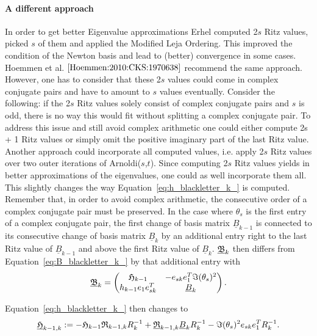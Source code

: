 \documentclass{scrartcl}
\numberwithin{equation}{section}
\begin{document}
\paragraph{A different approach}
In order to get better Eigenvalue approximations Erhel \cite{Erhel95aparallel} computed 2$s$ Ritz values, picked $s$ of them and applied the Modified Leja Ordering. This improved the condition of the Newton basis and lead to (better) convergence in some cases. Hoemmen et al. $\cite{Hoemmen:2010:CKS:1970638}$ recommend the same approach. However, one has to consider that these 2$s$ values could come in complex conjugate pairs and have to amount to $s$ values eventually. Consider the following: if the 2$s$ Ritz values solely consist of complex conjugate pairs and $s$ is odd, there is no way this would fit without splitting a complex conjugate pair. To address this issue and still avoid complex arithmetic one could either compute 2s + 1 Ritz values or simply omit the positive imaginary part of the last Ritz value. Another approach could incorporate all computed values, i.e. apply 2$s$ Ritz values over two outer iterations of Arnoldi($s$,$t$). Since computing 2$s$ Ritz values yields in better approximations of the eigenvalues, one could as well incorporate them all. This slightly changes the way Equation~\eqref{eq:h_blackletter_k_} is computed. Remember that, in order to avoid complex arithmetic, the consecutive order of a complex conjugate pair must be preserved. In the case where $\theta_s$ is the first entry of a complex conjugate pair, the first change of basis matrix $\underline{B}_{k - 1 }$ is connected to its consecutive change of basis matrix $\underline{B}_{k}$ by an additional entry right to the last Ritz value of $\underline{B}_{k - 1}$ and above the first Ritz value of $\underline{B}_k$. $\underline{\frak{B}}_k$ then differs from Equation~\eqref{eq:B_blackletter_k_} by that additional entry with
\begin{equation}
\underline{\frak{B}}_{k} = 
\begin{pmatrix}
	\frak{H}_{k - 1} & -e_{sk} e^T_1 \Im (\theta_s)^2 \\
	h_{k - 1} e_1 e^T_{sk} & \underline{B}_k
\end{pmatrix}.
\end{equation}

Equation~\eqref{eq:h_blackletter_k_} then changes to
\begin{equation}
\underline{\frak{H}}_{k - 1, k} := -\frak{H}_{k - 1} \frak{R}_{k - 1, k} R^{-1}_k + \underline{\frak{R}}_{k - 1, k} \underline{B}_k R^{-1}_k - \Im (\theta_s)^2 e_{sk} e^T_1  R^{-1}_{k}.
\end{equation}
\end{document}
